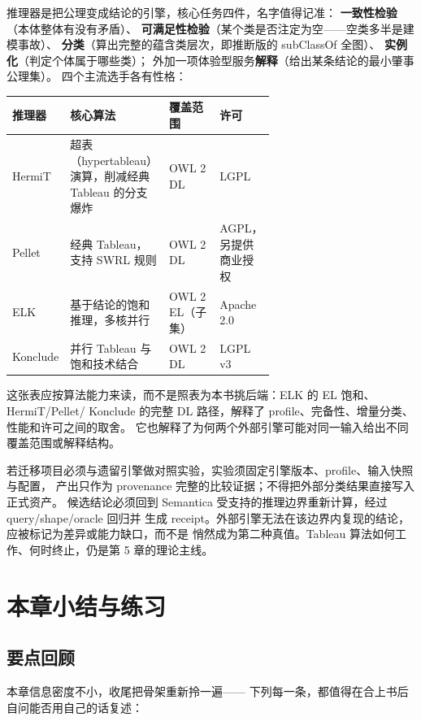 推理器是把公理变成结论的引擎，核心任务四件，名字值得记准：
\textbf{一致性检验}（本体整体有没有矛盾）、
\textbf{可满足性检验}（某个类是否注定为空——空类多半是建模事故）、
\textbf{分类}（算出完整的蕴含类层次，即推断版的 subClassOf 全图）、
\textbf{实例化}（判定个体属于哪些类）；
外加一项体验型服务\textbf{解释}（给出某条结论的最小肇事公理集）。
四个主流选手各有性格：

\begin{center}
\small
\begin{tabularx}{\linewidth}{@{}p{0.13\linewidth}p{0.30\linewidth}p{0.21\linewidth}X@{}}
\toprule
\textbf{推理器} & \textbf{核心算法} & \textbf{覆盖范围} & \textbf{许可} \\
\midrule
HermiT & 超表（hypertableau）演算，削减经典 Tableau 的分支爆炸 & OWL 2 DL & LGPL \\
Pellet & 经典 Tableau，支持 SWRL 规则 & OWL 2 DL & AGPL，另提供商业授权 \\
ELK & 基于结论的饱和推理，多核并行 & OWL 2 EL（子集） & Apache 2.0 \\
Konclude & 并行 Tableau 与饱和技术结合 & OWL 2 DL & LGPL v3 \\
\bottomrule
\end{tabularx}
\end{center}

这张表应按算法能力来读，而不是照表为本书挑后端：ELK 的 EL 饱和、HermiT/Pellet/
Konclude 的完整 DL 路径，解释了 profile、完备性、增量分类、性能和许可之间的取舍。
它也解释了为何两个外部引擎可能对同一输入给出不同覆盖范围或解释结构。

若迁移项目必须与遗留引擎做对照实验，实验须固定引擎版本、profile、输入快照与配置，
产出只作为 provenance 完整的比较证据；不得把外部分类结果直接写入正式资产。
候选结论必须回到 Semantica 受支持的推理边界重新计算，经过 query/shape/oracle 回归并
生成 receipt。外部引擎无法在该边界内复现的结论，应被标记为差异或能力缺口，而不是
悄然成为第二种真值。Tableau 算法如何工作、何时终止，仍是第 5 章的理论主线。

\section{本章小结与练习}

\subsection{要点回顾}

本章信息密度不小，收尾把骨架重新拎一遍——
下列每一条，都值得在合上书后自问能否用自己的话复述：

